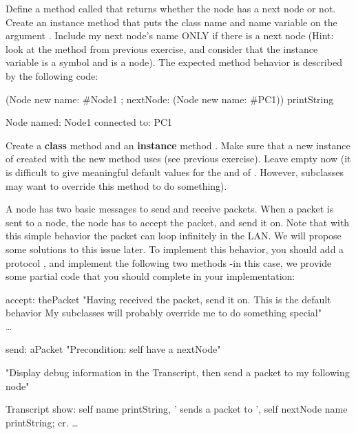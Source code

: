 \exercise  Define a method called  that
returns whether the node has a next node or not. \\

\exercise  Create an instance method  that puts
the class name and name variable on the argument
. Include my next node's name ONLY if there is a
next node (Hint: look at the method  from
previous exercise, and consider that the instance variable
 is a symbol and  is a node). The expected  method behavior is described by the following code:

\begin{code}
(Node new 
   name: \#Node1 ; 
   nextNode: (Node new name: \#PC1)) printString

Node named: Node1 connected to: PC1
\end{code}

\exercise  Create a \textbf{class} method  and an
\textbf{instance} method . Make sure that a new
instance of  created with the new method uses
 (see previous exercise). Leave
 empty now (it is difficult to give meaningful
default values for the  and  of
. However, subclasses may want to override this
method to do something). 

\exercise  A node has two basic messages to send and receive
packets. When a packet is sent to a node, the node has to accept
the packet, and send it on. Note that with this simple behavior
the packet can loop infinitely in the LAN. We will propose some
solutions to this issue later. To
implement this behavior, you should add a protocol
, and implement the following two methods -in
this case, we provide some partial code that you should complete
in your implementation:

\begin{code}
accept: thePacket
 "Having received the packet, send it on. This is the default
behavior My subclasses will probably override me to do 
something special"\\
    \dots

send: aPacket
"Precondition: self have a nextNode"

"Display debug information in the Transcript, then
send a packet to my following node"

 Transcript show:
   self name printString,
      ' sends a packet to ',
      self nextNode name printString; cr.
\dots
\end{code}

